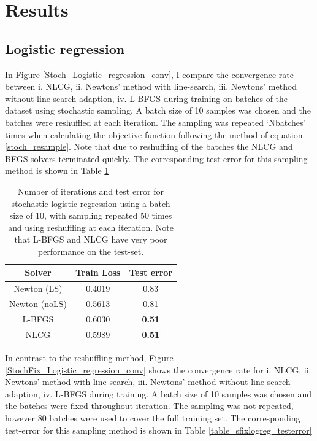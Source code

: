 \documentclass[11pt,twocolumn]{article}
\begin{document}
\section{Results}\label{results}
\subsection{Logistic regression} 
In Figure \ref{Stoch_Logistic_regression_conv}, I compare the convergence rate between i. NLCG, ii. Newtons' method with line-search, iii. Newtons' method without line-search adaption, iv. L-BFGS during training on batches of the dataset using stochastic sampling. A batch size of 10 samples was chosen and the batches were reshuffled at each iteration. The sampling was repeated `Nbatches' times when calculating the objective function following the method of equation \ref{stoch_resample}. Note that due to reshuffling of the batches the NLCG and BFGS solvers terminated quickly. The corresponding test-error for this sampling method is shown in Table \ref{table_stochlogreg_testerror}
\begin{table}[h!]
\begin{center}
\begin{tabular}{ ccc} %
\hline
Solver & Train Loss & Test error  \\ 
\hline 
\hline
Newton (LS) & 0.4019 & 0.83\\ 
Newton (noLS) & 0.5613 & 0.81\\ 
L-BFGS & 0.6030 & \textbf{0.51}\\ 
NLCG & 0.5989 & \textbf{0.51}\\ 
\end{tabular}
\end{center}
\caption{Number of iterations and test error for stochastic logistic regression using a batch size of 10, with sampling repeated 50 times and using reshuffling at each iteration. Note that L-BFGS and NLCG have very poor performance on the test-set.}\label{table_stochlogreg_testerror}
\end{table}

In contrast to the reshuffling method, Figure \ref{StochFix_Logistic_regression_conv} shows the convergence rate for i. NLCG, ii. Newtons' method with line-search, iii. Newtons' method without line-search adaption, iv. L-BFGS during training.  A batch size of 10 samples was chosen and the batches were fixed throughout iteration. The sampling was not repeated, however 80 batches were used to cover the full training set.  The corresponding test-error for this sampling method is shown in Table \ref{table_sfixlogreg_testerror}
\end{document}

